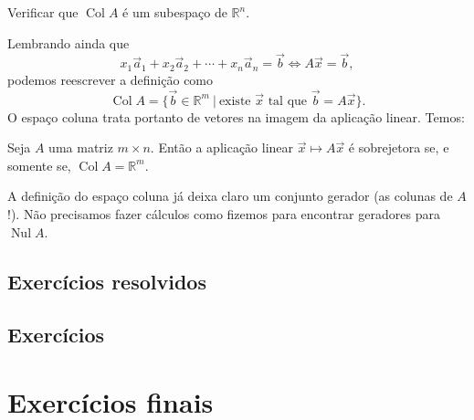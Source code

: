 \begin{exer}
	Verificar que $\operatorname{Col} A$ é um subespaço de $\mathbb{R}^n$.
\end{exer}

Lembrando ainda que
\begin{equation}
x_1 \vec{a}_1 + x_2 \vec{a}_2 + \cdots + x_n \vec{a}_n = \vec{b} \iff A \vec{x} = \vec{b},
\end{equation} podemos reescrever a definição como
\begin{equation}
\operatorname{Col} A = \{ \vec{b} \in \mathbb{R}^m \ | \ \text{existe } \vec{x} \text{ tal que } \vec{b} = A \vec{x} \}.
\end{equation} O espaço coluna trata portanto de vetores na imagem da aplicação linear. Temos:

\begin{prop}
	Seja $A$ uma matriz $m\times n$. Então a aplicação linear $\vec{x} \mapsto A \vec{x}$ é sobrejetora se, e somente se, $\operatorname{Col} A = \mathbb{R}^m.$
\end{prop}

A definição do espaço coluna já deixa claro um conjunto gerador (as colunas de $A$!). Não precisamos fazer cálculos como fizemos para encontrar geradores para $\operatorname{Nul} A$.

\subsection*{Exercícios resolvidos}

\construirExeresol

\subsection*{Exercícios}

\construirExer

\section{Exercícios finais}

\construirExer

%
